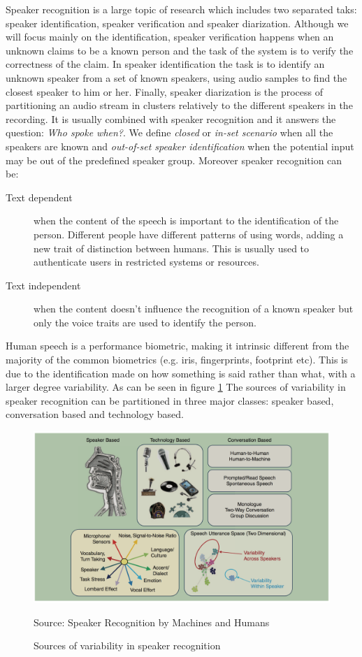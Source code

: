 Speaker recognition is a large topic of research which includes two separated taks: speaker
identification, speaker verification and speaker diarization. Although we will focus mainly on the identification,
speaker verification happens when an unknown claims to be a known person and the task
of the system is to verify the correctness of the claim.
In speaker identification the task is to identify an unknown speaker from a set of known speakers,
using audio samples to find the closest speaker to him or her.
Finally, speaker diarization is the process of partitioning an audio stream in clusters relatively
to the different speakers in the recording. It is usually combined with speaker recognition and it answers
the question: \textit{Who spoke when?}.
We define \textit{closed} or \textit{in-set scenario}
when all the speakers are known and \textit{out-of-set speaker identification} when the potential input
may be out of the predefined speaker group.
Moreover speaker recognition can be:
\begin{description}
        \item[Text dependent] when the content of the speech is important to the
        identification of the person. Different people have different patterns of
        using words, adding a new trait of distinction between humans. This is usually
        used to authenticate users in restricted systems or resources.
        \item[Text independent] when the content doesn't influence the recognition
        of a known speaker but only the voice traits are used to identify the person.
\end{description}
Human speech is a performance biometric, making it intrinsic different from the majority
of the common biometrics (e.g. iris, fingerprints, footprint etc). This is due to the
identification made on how something is said rather than what, with a larger
degree variability. As can be seen in figure \ref{fig:sourcesvar} The sources of variability in speaker recognition can be partitioned
in three major classes: speaker based, conversation based and technology based.

\begin{figure}[h]
\caption{Sources of variability in speaker recognition}
\label{fig:sourcesvar}
\centering
\includegraphics[scale=0.20]{sourcesvariability.png}
\par{Source: Speaker Recognition by Machines and Humans \cite{speaker-recognition}}

\end{figure}

